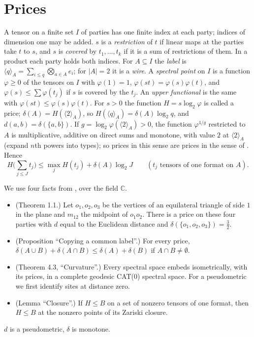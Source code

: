 \documentclass[11pt]{article}
\theoremstyle{definition}
\newcommand{\C}{\mathbb C}
\newcommand{\unit}[2]{\langle #1\rangle_{#2}}
\begin{document}
\section{Prices}
A tensor on a finite set $I$ of parties has one finite index at each party; indices of dimension one may be added. $s$ is a \emph{restriction} of $t$ if linear maps at the parties take $t$ to $s$, and $s$ is \emph{covered} by $t_1,\dots,t_k$ if it is a sum of restrictions of them. In a product each party holds both indices.
For $A\subseteq I$ the \emph{label} is $\unit qA=\sum_{i\le q}\bigotimes_{a\in A}e_i$; for $|A|=2$ it is a \emph{wire}. A \emph{spectral point} on $I$ is a function $\varphi\ge0$ of the tensors on $I$ with $\varphi(1)=1$, $\varphi(st)=\varphi(s)\varphi(t)$, and $\varphi(s)\le\sum\varphi(t_j)$ if $s$ is covered by the $t_j$. An \emph{upper functional} is the same with $\varphi(st)\le\varphi(s)\varphi(t)$. For $s>0$ the function $H=s\log_2\varphi$ is called a price;
$\delta(A)=H(\unit2A)$, so $H(\unit qA)=\delta(A)\log_2q$, and $d(a,b)=\delta(\{a,b\})$. If $g=\log_2\varphi(\unit2A)>0$, the function $\varphi^{1/g}$ restricted to $A$ is multiplicative, additive on direct sums and monotone, with value $2$ at $\unit2A$ (expand $n$th powers into types); so prices in this sense are prices in the sense of \cite{EG}. Hence
\begin{equation}\label{eq:sum}
H\Big(\sum_{j\le J}t_j\Big)\le\max_jH(t_j)+\delta(A)\log_2J\qquad(t_j\text{ tensors of one format on }A).
\end{equation}

We use four facts from \cite{EG}, over the field $\C$.
\begin{itemize}
\item[(I1)] (Theorem 1.1.) Let $o_1,o_2,o_3$ be the vertices of an equilateral triangle of side $1$ in the plane and $m_{12}$ the midpoint of $o_1o_2$. There is a price on these four parties with $d$ equal to the Euclidean distance and $\delta(\{o_1,o_2,o_3\})=\frac32$.
\item[(I2)] (Proposition ``Copying a common label''.) For every price, $\delta(A\cup B)+\delta(A\cap B)\le\delta(A)+\delta(B)$ if $A\cap B\ne\emptyset$.
\item[(I3)] (Theorem 4.3, ``Curvature''.) Every spectral space embeds isometrically, with its prices, in a complete geodesic CAT(0) spectral space. For a pseudometric we first identify sites at distance zero.
\item[(I4)] (Lemma ``Closure''.) If $H\le B$ on a set of nonzero tensors of one format, then $H\le B$ at the nonzero points of its Zariski closure.
\end{itemize}
$d$ is a pseudometric, $\delta$ is monotone.
\end{document}
